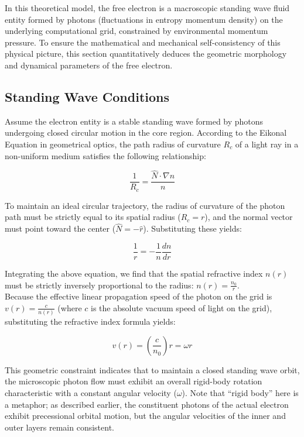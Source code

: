 \documentclass[12pt, a4paper]{article}
\begin{document}
In this theoretical model, the free electron is a macroscopic standing wave fluid entity formed by photons (fluctuations in entropy momentum density) on the underlying computational grid, constrained by environmental momentum pressure. To ensure the mathematical and mechanical self-consistency of this physical picture, this section quantitatively deduces the geometric morphology and dynamical parameters of the free electron.

\subsection{Standing Wave Conditions}

Assume the electron entity is a stable standing wave formed by photons undergoing closed circular motion in the core region. According to the Eikonal Equation in geometrical optics, the path radius of curvature $R_c$ of a light ray in a non-uniform medium satisfies the following relationship:

\begin{equation}
\frac{1}{R_c} = \frac{\hat{N} \cdot \nabla n}{n} 
\end{equation}

To maintain an ideal circular trajectory, the radius of curvature of the photon path must be strictly equal to its spatial radius ($R_c = r$), and the normal vector must point toward the center ($\hat{N} = -\hat{r}$). Substituting these yields:

\begin{equation}
\frac{1}{r} = -\frac{1}{n} \frac{dn}{dr} 
\end{equation}

Integrating the above equation, we find that the spatial refractive index $n(r)$ must be strictly inversely proportional to the radius: $n(r) = \frac{n_0}{r}$.\\
Because the effective linear propagation speed of the photon on the grid is $v(r) = \frac{c}{n(r)}$ (where $c$ is the absolute vacuum speed of light on the grid), substituting the refractive index formula yields:

\begin{equation}
v(r) = \left(\frac{c}{n_0}\right) r = \omega r 
\end{equation}

This geometric constraint indicates that to maintain a closed standing wave orbit, the microscopic photon flow must exhibit an overall rigid-body rotation characteristic with a constant angular velocity ($\omega$). Note that ``rigid body'' here is a metaphor; as described earlier, the constituent photons of the actual electron exhibit precessional orbital motion, but the angular velocities of the inner and outer layers remain consistent.
\end{document}
